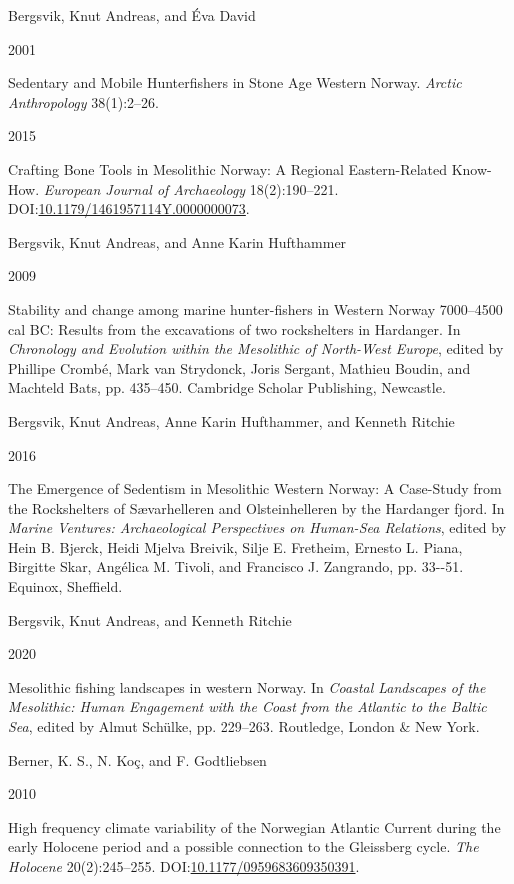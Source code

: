 \documentclass[
  12pt,
  a4paper,
  oneside]{book}
\newlength{\cslhangindent}
\newlength{\csllabelwidth}
\newlength{\cslentryspacingunit} %
\newenvironment{CSLReferences}[2] %
 {%
  \setlength{\parindent}{0pt}
  \ifodd #1
  \let\oldpar\par
  \def\par{\hangindent=\cslhangindent\oldpar}
  \fi
  \setlength{\parskip}{#2\cslentryspacingunit}
 }%
 {}
\newcommand{\CSLBlock}[1]{#1\hfill\break}
\newcommand{\CSLLeftMargin}[1]{\parbox[t]{\csllabelwidth}{#1}}
\newcommand{\CSLRightInline}[1]{\parbox[t]{\linewidth - \csllabelwidth}{#1}\break}
\begin{document}
\begin{CSLReferences}{0}{0}
\leavevmode{}%
\CSLBlock{Bergsvik, Knut Andreas, and Éva David}
\CSLLeftMargin{ 2001}%
\CSLRightInline{{Sedentary and Mobile Hunterfishers in Stone Age Western Norway}. \emph{Arctic Anthropology} 38(1):2--26.}

\leavevmode{}%
\CSLLeftMargin{ 2015 }%
\CSLRightInline{{Crafting Bone Tools in Mesolithic Norway: A Regional Eastern-Related Know-How}. \emph{European Journal of Archaeology} 18(2):190--221. DOI:\href{https://doi.org/10.1179/1461957114Y.0000000073}{10.1179/1461957114Y.0000000073}.}

\leavevmode{}%
\CSLBlock{Bergsvik, Knut Andreas, and Anne Karin Hufthammer}
\CSLLeftMargin{ 2009}%
\CSLRightInline{{Stability and change among marine hunter-fishers in Western Norway 7000--4500 cal BC: Results from the excavations of two rockshelters in Hardanger}. In \emph{{Chronology and Evolution within the Mesolithic of North-West Europe}}, edited by Phillipe Crombé, Mark van Strydonck, Joris Sergant, Mathieu Boudin, and Machteld Bats, pp. 435--450. Cambridge Scholar Publishing, Newcastle.}

\leavevmode{}%
\CSLBlock{Bergsvik, Knut Andreas, Anne Karin Hufthammer, and Kenneth Ritchie}
\CSLLeftMargin{ 2016}%
\CSLRightInline{{The Emergence of Sedentism in Mesolithic Western Norway: A Case-Study from the Rockshelters of Sævarhelleren and Olsteinhelleren by the Hardanger fjord}. In \emph{{Marine Ventures: Archaeological Perspectives on Human-Sea Relations}}, edited by Hein B. Bjerck, Heidi Mjelva Breivik, Silje E. Fretheim, Ernesto L. Piana, Birgitte Skar, Angélica M. Tivoli, and Francisco J. Zangrando, pp. 33-\/-51. Equinox, Sheffield.}

\leavevmode{}%
\CSLBlock{Bergsvik, Knut Andreas, and Kenneth Ritchie}
\CSLLeftMargin{ 2020}%
\CSLRightInline{{Mesolithic fishing landscapes in western Norway}. In \emph{{Coastal Landscapes of the Mesolithic: Human Engagement with the Coast from the Atlantic to the Baltic Sea}}, edited by Almut Schülke, pp. 229--263. Routledge, London \& New York.}

\leavevmode{}%
\CSLBlock{Berner, K. S., N. Koç, and F. Godtliebsen}
\CSLLeftMargin{ 2010}%
\CSLRightInline{{High frequency climate variability of the Norwegian Atlantic Current during the early Holocene period and a possible connection to the Gleissberg cycle}. \emph{The Holocene} 20(2):245--255. DOI:\href{https://doi.org/10.1177/0959683609350391}{10.1177/0959683609350391}.}


\end{CSLReferences}
\end{document}
